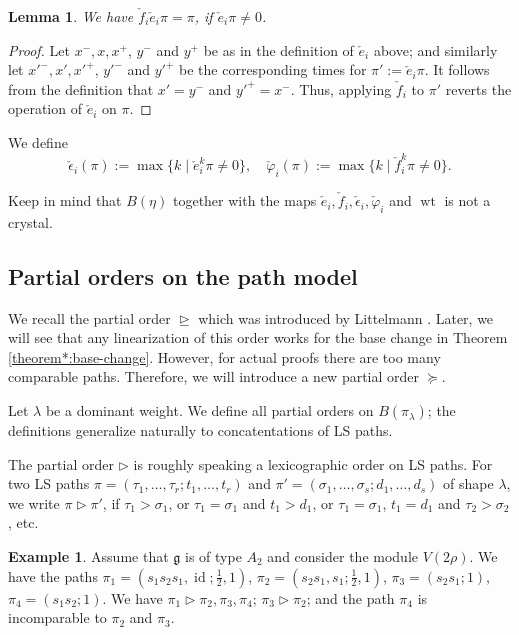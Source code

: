 \documentclass[final]{amsart}
\theoremstyle{plain}
\newtheorem{lemma}[corollary]{Lemma}
\theoremstyle{definition}
\newtheorem{example}[corollary]{Example}
\newcommand{\frakg}{\mathfrak g}
\newcommand{\cf}{\check{f}}
\newcommand{\ce}{\check{e}}
\newcommand{\cepsilon}{\check{\epsilon}}
\newcommand{\cphi}{\check{\varphi}}
\DeclareMathOperator{\id}{id}
\DeclareMathOperator{\weight}{wt}
\begin{document}
\begin{lemma}
    We have $\cf_i\ce_i\pi = \pi$, if $\ce_i\pi \neq 0$.
\end{lemma}
\begin{proof}
    Let $x^-, x, x^+$, $y^-$ and $y^+$ be as in the definition of $\ce_i$ above; and similarly let $x'^-, x', x'^+$, $y'^-$ and $y'^+$ be the corresponding times for $\pi' := \ce_i\pi$.
    It follows from the definition that $x' = y^-$ and $y'^+ = x^-$.
    Thus, applying $\cf_i$ to $\pi'$ reverts the operation of $\ce_i$ on $\pi$.
\end{proof}

We define
\[
    \cepsilon_i(\pi) := \max\{ k \mid \ce_i^k \pi \ne 0 \}, \quad \cphi_i(\pi) := \max\{ k \mid \cf_i^k \pi \ne 0 \}.
\]

Keep in mind that $B(\eta)$ together with the maps $\ce_i, \cf_i, \cepsilon_i, \cphi_i$ and $\weight$ is not a crystal.

\subsection{Partial orders on the path model}
\label{section:partial-orders}

We recall the partial order $\trianglerighteq$ which was introduced by Littelmann \cite{Littelmann:ContractingModules-StandardMonomialTheory}.
Later, we will see that any linearization of this order works for the base change in Theorem \ref{theorem*:base-change}.
However, for actual proofs there are too many comparable paths.
Therefore, we will introduce a new partial order $\succeq$.

Let $\lambda$ be a dominant weight.
We define all partial orders on $B(\pi_\lambda)$; the definitions generalize naturally to concatentations of LS paths.

The partial order $\triangleright$ is roughly speaking a lexicographic order on LS paths.
For two LS paths $\pi = (\tau_1, \dots, \tau_r; t_1, \dots, t_r)$ and $\pi' = (\sigma_1, \dots, \sigma_s; d_1, \dots, d_s)$ of shape $\lambda$, we write $\pi \triangleright \pi'$, if $\tau_1 > \sigma_1$, or $\tau_1 = \sigma_1$ and $t_1 > d_1$, or $\tau_1 = \sigma_1$, $t_1 = d_1$ and $\tau_2 > \sigma_2$, etc.

\begin{example}
    Assume that $\frakg$ is of type $A_2$ and consider the module $V(2\rho)$.
    We have the paths $\pi_1 = (s_1s_2s_1, \id; \frac12, 1)$, $\pi_2 = (s_2s_1, s_1; \frac12, 1)$, $\pi_3 = (s_2s_1; 1)$, $\pi_4 = (s_1s_2; 1)$. We have $\pi_1 \triangleright \pi_2, \pi_3, \pi_4$; $\pi_3 \triangleright \pi_2$; and the path $\pi_4$ is incomparable to $\pi_2$ and $\pi_3$.
\end{example}
\end{document}
